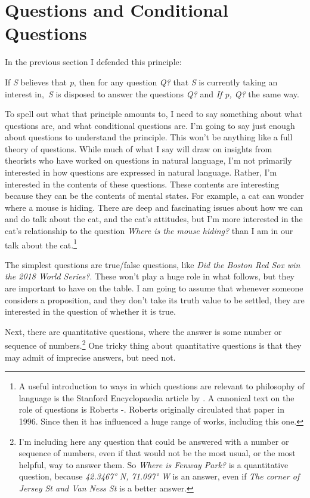 \documentclass[
  11pt,
]{book}
\providecommand{\tightlist}{%
  \setlength{\itemsep}{0pt}\setlength{\parskip}{0pt}}
\begin{document}
\hypertarget{questions}{%
\section{Questions and Conditional Questions}\label{questions}}

In the previous section I defended this principle:

\begin{description}
\tightlist
\item[Relevant Conditional Questions]
If \emph{S} believes that \emph{p}, then for any question \emph{Q?} that \emph{S} is currently taking an interest in,~\emph{S} is disposed to answer the questions \emph{Q?} and \emph{If p, Q?} the same way.
\end{description}

To spell out what that principle amounts to, I need to say something about what questions are, and what conditional questions are. I'm going to say just enough about questions to understand the principle. This won't be anything like a full theory of questions. While much of what I say will draw on insights from theorists who have worked on questions in natural language, I'm not primarily interested in how questions are expressed in natural language. Rather, I'm interested in the contents of these questions. These contents are interesting because they can be the contents of mental states. For example, a cat can wonder where a mouse is hiding. There are deep and fascinating issues about how we can and do talk about the cat, and the cat's attitudes, but I'm more interested in the cat's relationship to the question \emph{Where is the mouse hiding?} than I am in our talk about the cat.\footnote{A useful introduction to ways in which questions are relevant to philosophy of language is the Stanford Encyclopaedia article by \citet{sep-questions}. A canonical text on the role of questions is Roberts -\citet{Roberts2012}. Roberts originally circulated that paper in 1996. Since then it has influenced a huge range of works, including this one.}

The simplest questions are true/false questions, like \emph{Did the Boston Red Sox win the 2018 World Series?}. These won't play a huge role in what follows, but they are important to have on the table. I am going to assume that whenever someone considers a proposition, and they don't take its truth value to be settled, they are interested in the question of whether it is true.

Next, there are quantitative questions, where the answer is some number or sequence of numbers.\footnote{I'm including here any question that could be answered with a number or sequence of numbers, even if that would not be the most usual, or the most helpful, way to answer them. So \emph{Where is Fenway Park?} is a quantitative question, because \emph{42.3467° N, 71.097° W} is an answer, even if \emph{The corner of Jersey St and Van Ness St} is a better answer.} One tricky thing about quantitative questions is that they may admit of imprecise answers, but need not.
\end{document}
